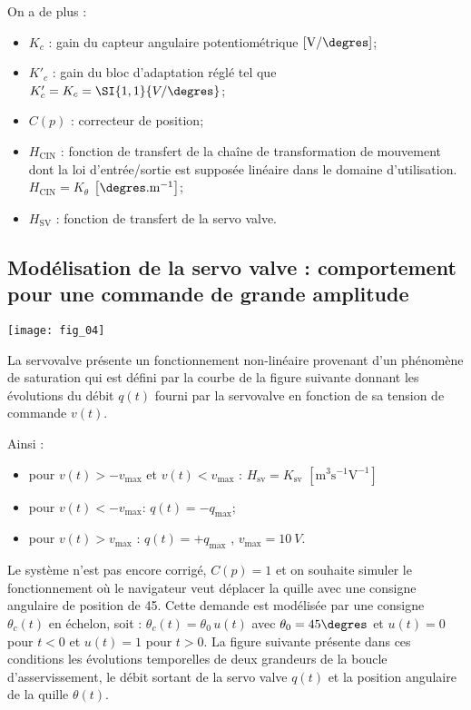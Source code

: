 On a de plus :
\begin{itemize}
\item $K_c$ : gain du capteur angulaire potentiométrique $\left[\text{V}/\degres\right]$;
\item $K'_c$ : gain du bloc d'adaptation réglé tel que $K'_c=K_c=\SI{1,1}{V/\degres}$;
\item $C(p)$ : correcteur de position;
\item $H_{\text{CIN}}$ : fonction de transfert de la chaîne de transformation de mouvement dont la loi
d’entrée/sortie est supposée linéaire dans le domaine d’utilisation. $H_{\text{CIN}}=K_{\theta}$ $\left[\degres.\text{m}^{-1}\right]$;
\item $H_{\text{SV}}$ : fonction de transfert de la servo valve.
\end{itemize}

\fi

\subsection*{Modélisation de la servo valve : comportement pour une commande de grande amplitude}

\ifprof
\else
\begin{marginfigure}
\texttt{[image: fig\_04]}
\end{marginfigure}

La servovalve présente un fonctionnement non-linéaire provenant
d’un phénomène de saturation qui est défini par la courbe de la
figure suivante donnant les évolutions du débit $q(t)$ fourni par la
servovalve en fonction de sa tension de commande $v(t)$.

Ainsi :
\begin{itemize}
\item pour $v(t) > -v_{\text{max}}$ et $v(t) < v_{\text{max}}$ : $H_{\text{sv}} = K_{\text{sv}}$ $\left[\text{m}^3 \text{s}^{-1}\text{V}^{-1}\right]$
\item pour $v(t) < -v_{\text{max}}$: $q(t) = -q_{\text{max}}$;
\item pour $v(t) > v_{\text{max}}$ : $q(t) = +q_{\text{max}}$ , $v_{\text{max}} = \SI{10}{V}$.
\end{itemize}
Le système n’est pas encore corrigé, $C(p) =1$ et on souhaite simuler
le fonctionnement où le navigateur veut déplacer la quille avec une
consigne angulaire de position de 45\degres. Cette demande est modélisée
par une consigne $\theta_c(t)$ en échelon, soit : $\theta_c(t)=\theta_0\,u(t)$ avec $\theta_0=45\degres$ et
$u(t) = 0$ pour $t < 0$ et $u(t) = 1$ pour $t > 0$. La figure suivante présente dans ces conditions les évolutions temporelles de deux grandeurs de la boucle d’asservissement, le débit sortant de la servo valve
$q(t)$ et la position angulaire de la quille $\theta(t)$.

